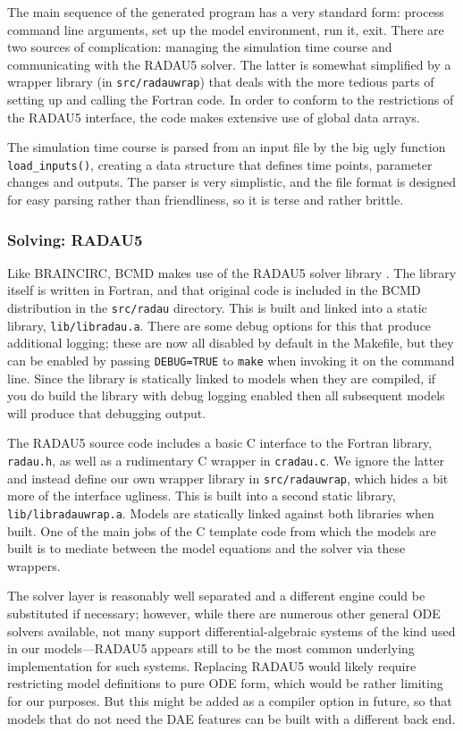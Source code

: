\documentclass[a4paper,11pt]{article}
\begin{document}
The main sequence of the generated program has a very standard form: process command line arguments, set up the model environment, run it, exit. There are two sources of complication: managing the simulation time course and communicating with the RADAU5 solver. The latter is somewhat simplified by a wrapper library (in \texttt{src/radauwrap}) that deals with the more tedious parts of setting up and calling the Fortran code. In order to conform to the restrictions of the RADAU5 interface, the code makes extensive use of global data arrays.

The simulation time course is parsed from an input file by the big ugly function \texttt{load\_inputs()}, creating a data structure that defines time points, parameter changes and outputs. The parser is very simplistic, and the file format is designed for easy parsing rather than friendliness, so it is terse and rather brittle.


\subsubsection{Solving: RADAU5}\label{radau}

Like BRAINCIRC, BCMD makes use of the RADAU5 solver library \citep{Hairer:1996ub}. The library itself is written in Fortran, and that original code is included in the BCMD distribution in the \texttt{src/radau} directory. This is built and linked into a static library, \texttt{lib/libradau.a}. There are some debug options for this that produce additional logging; these are now all disabled by default in the Makefile, but they can be enabled by passing \texttt{DEBUG=TRUE} to \texttt{make} when invoking it on the command line. Since the library is statically linked to models when they are compiled, if you do build the library with debug logging enabled then all subsequent models will produce that debugging output.

The RADAU5 source code includes a basic C interface to the Fortran library, \texttt{radau.h}, as well as a rudimentary C wrapper in \texttt{cradau.c}. We ignore the latter and instead define our own wrapper library in \texttt{src/radauwrap}, which hides a bit more of the interface ugliness. This is built into a second static library, \texttt{lib/libradauwrap.a}. Models are statically linked against both libraries when built. One of the main jobs of the C template code from which the models are built is to mediate between the model equations and the solver via these wrappers.

The solver layer is reasonably well separated and a different engine could be substituted if necessary; however, while there are numerous other general ODE solvers available, not many support differ\-ential-algebraic systems of the kind used in our models---RADAU5 appears still to be the most common underlying implementation for such systems. Replacing RADAU5 would  likely require restricting model definitions to pure ODE form, which would be rather limiting for our purposes. But this might be added as a compiler option in future, so that models that do not need the DAE features can be built with a different back end.
\end{document}
